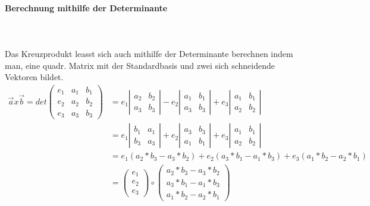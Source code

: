 \documentclass[a4paper]{article} %
\begin{document}
	\paragraph{Berechnung mithilfe der Determinante}
	\hspace{0 cm} \\ \noindent \\
	Das Kreuzprodukt leasst sich auch mithilfe der Determinante berechnen indem man, eine quadr. Matrix mit der Standardbasis und zwei sich schneidende Vektoren
	bildet.\\
	$\begin{array}{cc}
	\vec{a} x \vec{b}=det\begin{pmatrix} e_1 & a_1 & b_1 \\ e_2 & a_2 & b_2  \\ e_3 & a_3 & b_3  \end{pmatrix} 
	&= e_1\left|\begin{array}{cc} a_2 & b_2 \\ a_3 & b_3\end{array} \right|-e_2\left|\begin{array}{cc} a_1 & b_1 \\ a_3 & b_3\end{array} \right|+e_3\left|\begin{array}{cc} a_1 & b_1 \\ a_2 & b_2\end{array} \right|\\
	&= e_1\left|\begin{array}{cc} b_1 & a_1 \\ b_3 & a_3\end{array} \right|+e_2\left|\begin{array}{cc} a_3 & b_3 \\ a_1 & b_1\end{array} \right|+e_3\left|\begin{array}{cc} a_1 & b_1 \\ a_2 & b_2\end{array} \right|\\
	&= e_1(a_2*b_3-a_3*b_2)+e_2(a_3*b_1-a_1*b_3)+e_3(a_1*b_2-a_2*b_1)\\
	&=\begin{pmatrix} e_1 \\ e_2 \\ e_3 \end{pmatrix} \circ \begin{pmatrix} a_2*b_3-a_3*b_2 \\ a_3*b_1-a_1*b_3 \\ a_1*b_2-a_2*b_1 \end{pmatrix} 
	\end{array}$
\end{document}
